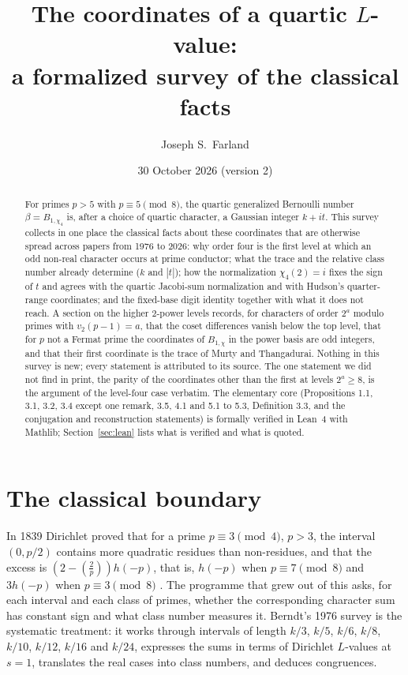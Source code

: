 \documentclass[11pt,reqno]{amsart}
\theoremstyle{plain}
\theoremstyle{definition}
\newcommand{\leg}[2]{\left(\frac{#1}{#2}\right)}
\begin{document}
\title[The coordinates of a quartic $L$-value]{The coordinates of a quartic $L$-value:\\
a formalized survey of the classical facts}
\author{Joseph S.\ Farland}
\date{30 October 2026 (version 2)}

\begin{abstract}
For primes $p>5$ with $p\equiv5\pmod8$, the quartic generalized Bernoulli number $\beta=B_{1,\chi_4}$ is,
after a choice of quartic character, a Gaussian integer $k+it$. This survey collects in one place the
classical facts about these coordinates that are otherwise spread across papers from 1976 to 2026: why
order four is the first level at which an odd non-real character occurs at prime conductor; what the
trace and the relative class number already determine ($k$ and $|t|$); how the normalization
$\chi_4(2)=i$ fixes the sign of $t$ and agrees with the quartic Jacobi-sum normalization and with Hudson's
quarter-range coordinates; and the fixed-base digit identity together with what it does not reach. A
section on the higher $2$-power levels records, for characters of order $2^a$ modulo primes with
$v_2(p-1)=a$, that the coset differences vanish below the top level, that for $p$ not a Fermat prime the
coordinates of $B_{1,\chi}$ in the power basis are odd integers, and that their first coordinate is the trace
of Murty and Thangadurai. Nothing in this survey is new; every statement is attributed to its source. The
one statement we did not find in print, the parity of the coordinates other than the first at levels
$2^a\ge8$, is the argument of the level-four case verbatim. The elementary core (Propositions 1.1, 3.1, 3.2, 3.4 except one remark, 3.5,
4.1 and 5.1 to 5.3, Definition 3.3, and the conjugation and reconstruction statements) is formally
verified in Lean~4 with Mathlib; Section~\ref{sec:lean} lists what is verified and what is quoted.
\end{abstract}
\maketitle

\section{The classical boundary}\label{sec:boundary}

In 1839 Dirichlet proved that for a prime $p\equiv3\pmod4$, $p>3$, the interval $(0,p/2)$ contains more
quadratic residues than non-residues, and that the excess is $(2-\leg2p)h(-p)$, that is, $h(-p)$ when
$p\equiv7\pmod8$ and $3h(-p)$ when $p\equiv3\pmod8$ \cite[(1.1)]{Berndt}. The programme that grew out of this
asks, for each interval and each class of primes, whether the corresponding character sum has constant
sign and what class number measures it. Berndt's 1976 survey \cite{Berndt} is the systematic treatment: it
works through intervals of length $k/3$, $k/5$, $k/6$, $k/8$, $k/10$, $k/12$, $k/16$ and $k/24$, expresses the
sums in terms of Dirichlet $L$-values at $s=1$, translates the real cases into class numbers, and deduces
congruences.
\end{document}
